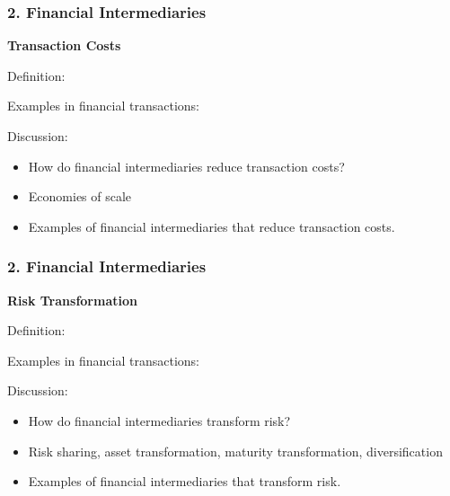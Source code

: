 \documentclass{beamer}
\begin{document}
\begin{frame}[t]
    \frametitle{2. Financial Intermediaries}   

    \textbf{Transaction Costs}
    \vspace{1em}

    Definition:
    \vspace{1em}
    
    Examples in financial transactions:
    \vspace{1em}

    Discussion:
    \begin{itemize}
        \item How do financial intermediaries reduce transaction costs?
        \item Economies of scale
        \item Examples of financial intermediaries that reduce transaction costs.
    \end{itemize}

\end{frame}

\begin{frame}[t]
    \frametitle{2. Financial Intermediaries}

    \textbf{Risk Transformation}
    \vspace{1em}

    Definition:
    \vspace{2em}
    
    Examples in financial transactions:
    \vspace{2em}

    Discussion:
    \begin{itemize}
        \item How do financial intermediaries transform risk?
        \item Risk sharing, asset transformation, maturity transformation, diversification
        \item Examples of financial intermediaries that transform risk.
    \end{itemize}

\end{frame}
\end{document}
